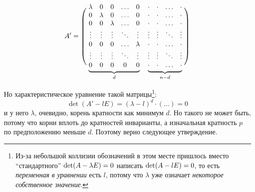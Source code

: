 \documentclass[a4paper,12pt]{article}
\begin{document}
  \[
    A' = \left(\vphantom{\begin{matrix} 1 \\ 1 \\ 1 \\ 1 \\ 1 \\ 1 \\ 1 \end{matrix}}\right.
      \underbrace{
        \begin{matrix}
          \lambda   & 0         & 0         & \ldots & 0\\
          0         & \lambda   & 0         & \ldots & 0\\
          0         & 0         & \lambda   & \ldots & 0\\
          \vdots    & \vdots    & \vdots    & \ddots & \vdots\\
          0         & 0         & 0         & \ldots & \lambda\\
          \vdots    & \vdots    & \vdots    & \ddots & \vdots\\
          0         & 0         & 0         & 0      & 0\\
        \end{matrix}
      }_{d}
      \ \ \ \underbrace{  %
        \begin{matrix}
          \cdot  & \cdot  & \ldots & \cdot\\
          \cdot  & \cdot  & \ldots & \cdot\\
          \cdot  & \cdot  & \ldots & \cdot\\
          \vdots & \vdots & \ddots & \vdots\\
          \cdot  & \cdot  & \ldots & \cdot\\
          \vdots & \vdots & \ddots & \vdots\\
          \cdot  & \cdot  & \ldots & \cdot\\
        \end{matrix}
      }_{n - d}
    \left.\vphantom{\begin{matrix} 1 \\ 1 \\ 1 \\ 1 \\ 1 \\ 1 \\ 1 \end{matrix}}\right)
  \]
  
  Но характеристическое уравнение такой матрицы\footnote{Из-за небольшой коллизии обозначений в этом месте пришлось вместо ``стандартного'' $\det(A \hm- \lambda E) \hm= 0$ написать $\det(A \hm- l E) \hm= 0$, то есть \emph{переменная в уравнении} есть $l$, потому что $\lambda$ уже означает \emph{некоторое собственное значение}.}:
  \[
    \det(A' - l E) = (\lambda - l)^d \cdot (\ldots) = 0
  \]
  и у него $\lambda$, очевидно, корень кратности как минимум $d$.
  Но такого не может быть, потому что корни вплоть до кратностей инварианты, а изначальная кратность $p$ по предположению меньше $d$.
  Поэтому верно следующее утверждение.
  
\end{document}
